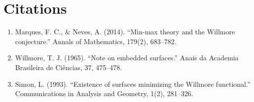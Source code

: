 \section{Citations}

\begin{enumerate}
\item Marques, F. C., \& Neves, A. (2014). ``Min-max theory and the Willmore conjecture.'' Annals of Mathematics, 179(2), 683--782.
\item Willmore, T. J. (1965). ``Note on embedded surfaces.'' Anais da Academia Brasileira de Ciências, 37, 475--478.
\item Simon, L. (1993). ``Existence of surfaces minimizing the Willmore functional.'' Communications in Analysis and Geometry, 1(2), 281--326.
\end{enumerate}

